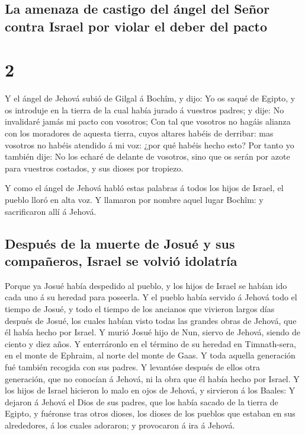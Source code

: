 \hypertarget{la-amenaza-de-castigo-del-uxe1ngel-del-seuxf1or-contra-israel-por-violar-el-deber-del-pacto}{%
\subsection{La amenaza de castigo del ángel del Señor contra Israel por
violar el deber del
pacto}\label{la-amenaza-de-castigo-del-uxe1ngel-del-seuxf1or-contra-israel-por-violar-el-deber-del-pacto}}

\hypertarget{section-1}{%
\section{2}\label{section-1}}

 Y el ángel de Jehová subió de Gilgal á Bochîm, y dijo: Yo
os saqué de Egipto, y os introduje en la tierra de la cual había jurado
á vuestros padres; y dije: No invalidaré jamás mi pacto con vosotros;
 Con tal que vosotros no hagáis alianza con los moradores de
aquesta tierra, cuyos altares habéis de derribar: mas vosotros no habéis
atendido á mi voz: ¿por qué habéis hecho esto?  Por tanto yo
también dije: No los echaré de delante de vosotros, sino que os serán
por azote para vuestros costados, y sus dioses por tropiezo.

 Y como el ángel de Jehová habló estas palabras á todos los
hijos de Israel, el pueblo lloró en alta voz.  Y llamaron
por nombre aquel lugar Bochîm: y sacrificaron allí á Jehová.

\hypertarget{despuuxe9s-de-la-muerte-de-josuuxe9-y-sus-compauxf1eros-israel-se-volviuxf3-idolatruxeda}{%
\subsection{Después de la muerte de Josué y sus compañeros, Israel se
volvió
idolatría}\label{despuuxe9s-de-la-muerte-de-josuuxe9-y-sus-compauxf1eros-israel-se-volviuxf3-idolatruxeda}}

 Porque ya Josué había despedido al pueblo, y los hijos de
Israel se habían ido cada uno á su heredad para poseerla.  Y
el pueblo había servido á Jehová todo el tiempo de Josué, y todo el
tiempo de los ancianos que vivieron largos días después de Josué, los
cuales habían visto todas las grandes obras de Jehová, que él había
hecho por Israel.  Y murió Josué hijo de Nun, siervo de
Jehová, siendo de ciento y diez años.  Y enterráronlo en el
término de su heredad en Timnath-sera, en el monte de Ephraim, al norte
del monte de Gaas.  Y toda aquella generación fué también
recogida con sus padres. Y levantóse después de ellos otra generación,
que no conocían á Jehová, ni la obra que él había hecho por Israel.
 Y los hijos de Israel hicieron lo malo en ojos de Jehová,
y sirvieron á los Baales:  Y dejaron á Jehová el Dios de
sus padres, que los había sacado de la tierra de Egipto, y fuéronse tras
otros dioses, los dioses de los pueblos que estaban en sus alrededores,
á los cuales adoraron; y provocaron á ira á Jehová.

